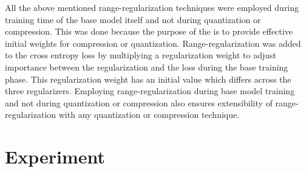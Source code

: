 \documentclass[10pt,twocolumn,letterpaper]{article}
\begin{document}
All the above mentioned range-regularization techniques were employed during training time of the base model itself and not during quantization or compression. This was done because the purpose of the  is to provide effective initial weights for compression or quantization. Range-regularization was added to the cross entropy loss by multiplying a regularization weight to adjust importance between the regularization and the loss during the base training phase. This regularization weight has an initial value which differs across the three regularizers. Employing range-regularization during base model training and not during quantization or compression also ensures extensibility of range-regularization with any quantization or compression technique.  \section{Experiment}
\label{experiment}
\end{document}
